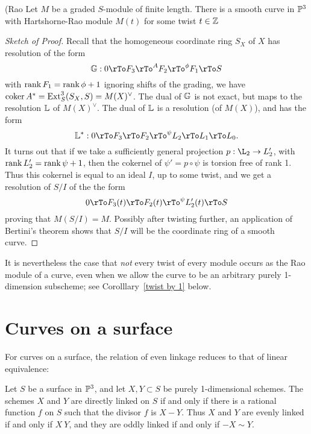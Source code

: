 \begin{theorem}(Rao\cite{***}
Let $M$ be a graded $S$-module of finite length. There is a smooth curve in ${\mathbb P}^3$ with Hartshorne-Rao module $M(t)$ for some twist $t\in {\mathbb Z}$
\end{theorem}
\begin{proof}[Sketch of Proof] 
Recall that the homogeneous coordinate
ring $S_X$ of $X$ has resolution of the form
$$
\GG: 0\rTo F_3\rTo^A F_2\rTo^\phi F_1\rTo S
$$
with $\operatorname{rank} F_1 = \operatorname{rank} \phi+1$
ignoring shifts of the grading, we have ${\rm{coker}\,} A^* = {\rm{Ext}}^3_S(S_X,S)  = M(X)^\vee$. The dual of ${\mathbb G}$ is not exact, but maps to the 
resolution ${\mathbb L}$ of $M(X)^\vee$. The dual of ${\mathbb L}$ is a resolution (of $M(X)$), and has the form
$$
\LL^*: 0\rTo F_3 \rTo F_2\rTo^\psi L_2\rTo L_1\rTo L_0.
$$
It turns out that if we take a sufficiently general projection $p: \L_2\to L_2'$, with $\operatorname{rank} L_2' = \operatorname{rank} \psi+1$, then
the cokernel of $\psi' = p\circ \psi$ is torsion free of rank 1. Thus this cokernel is equal to an ideal $I$, up to some twist, 
and we get a resolution of $S/I$ of the the form
$$
0\rTo F_3(t) \rTo F_2(t) \rTo^\psi L_2'(t)\rTo S
$$
proving that $M(S/I) = M$. Possibly after twisting further, an application of Bertini's theorem shows that $S/I$ will be the coordinate ring of a smooth curve.
\end{proof}

It is nevertheless the case that \emph{not} every twist of every module occurs as the Rao module of a curve, even when we allow the curve to be an arbitrary purely 1-dimension subscheme; see Corolllary~\ref{twist by 1} below.

\section{Curves on a surface}
For curves on a surface,
the relation of even linkage reduces to
that of linear equivalence:

\begin{proposition}
Let $S$ be a surface in ${\mathbb P}^3$, and let $X,Y\subset S$ be purely 1-dimensional schemes. The schemes $X$ and $Y$ are directly linked on $S$ if and only if
there is a rational function $f$ on $S$ such that the divisor $f$ is $X-Y$. Thus $X$ and $Y$ are evenly linked if and only if 
$X~Y$, and they are oddly linked if and only if $-X\sim Y$.
\end{proposition}

